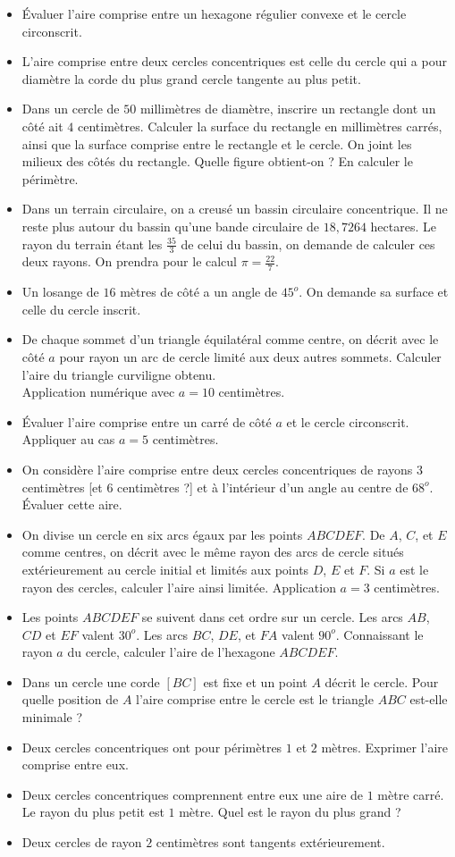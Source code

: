 \documentclass[12 pt]{report}
\theoremstyle{plain}
\newcounter{n}
\renewcommand{\it}{\item[$\mathbf{\then}.$]\stepcounter{n} }
\begin{document}
\begin{itemize}
\it Évaluer l'aire comprise entre un hexagone régulier convexe et le cercle circonscrit.
\it L'aire comprise entre deux cercles concentriques est celle du cercle qui a pour diamètre la corde du plus grand cercle tangente au plus petit. 
\it Dans un cercle de $50$ millimètres de diamètre, inscrire un rectangle dont un côté ait $4$ centimètres. Calculer la surface du rectangle en millimètres carrés, ainsi que la surface comprise entre le rectangle et le cercle. On joint les milieux des côtés du rectangle. Quelle figure obtient-on ? En calculer le périmètre. 
\it Dans un terrain circulaire, on a creusé un bassin circulaire concentrique. Il ne reste plus autour du bassin qu'une bande circulaire de $18,7264$ hectares. Le rayon du terrain étant les $\frac{35}3$ de celui du bassin, on demande de calculer ces deux rayons. On prendra pour le calcul $\pi = \frac{22}7$. 
\it Un losange de $16$ mètres de côté a un angle de $45^o$. On demande sa surface et celle du cercle inscrit. 
\it De chaque sommet d'un triangle équilatéral comme centre, on décrit avec le côté $a$ pour rayon un arc de cercle limité aux deux autres sommets. Calculer l'aire du triangle curviligne obtenu. \\ Application numérique avec $a=10$ centimètres.
\it Évaluer l'aire comprise entre un carré de côté $a$ et le cercle circonscrit. Appliquer au cas $a=5$ centimètres. 
\it On considère l'aire comprise entre deux cercles concentriques de rayons $3$ centimètres [et $6$ centimètres ?] et à l'intérieur d'un angle au centre de $68^o$. Évaluer cette aire.
\it On divise un cercle en six arcs égaux par les points $ABCDEF$. De $A$, $C$, et $E$ comme centres, on décrit avec le même rayon des arcs de cercle situés extérieurement au cercle initial et limités aux points $D$, $E$ et $F$. Si $a$ est le rayon des cercles, calculer l'aire ainsi limitée. Application $a=3$ centimètres. 
\it Les points $ABCDEF$ se suivent dans cet ordre sur un cercle. Les arcs $AB$, $CD$ et $EF$ valent $30^o$. Les arcs $BC$, $DE$, et $FA$ valent $90^o$. Connaissant le rayon $a$ du cercle, calculer l'aire de l'hexagone $ABCDEF$. 
\it Dans un cercle une corde $[BC]$ est fixe et un point $A$ décrit le cercle. Pour quelle position de $A$ l'aire comprise entre le cercle est le triangle $ABC$ est-elle minimale ? 
\it Deux cercles concentriques ont pour périmètres $1$ et $2$ mètres. Exprimer l'aire comprise entre eux. 
\it Deux cercles concentriques comprennent entre eux une aire de $1$ mètre carré. Le rayon du plus petit est $1$ mètre. Quel est le rayon du plus grand ? 
\it Deux cercles de rayon $2$ centimètres sont tangents extérieurement. 

\end{itemize}
\end{document}
